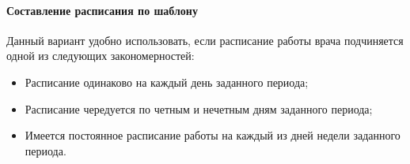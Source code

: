 \paragraph{Составление расписания по шаблону} \label{pol_shdsh}

Данный вариант удобно использовать, если расписание работы врача подчиняется одной из следующих закономерностей:
\begin{itemize}
 \item Расписание одинаково на каждый день заданного периода;
 \item Расписание чередуется по четным и нечетным дням заданного периода;
 \item Имеется постоянное расписание работы на каждый из дней недели заданного периода.
\end{itemize}
 
